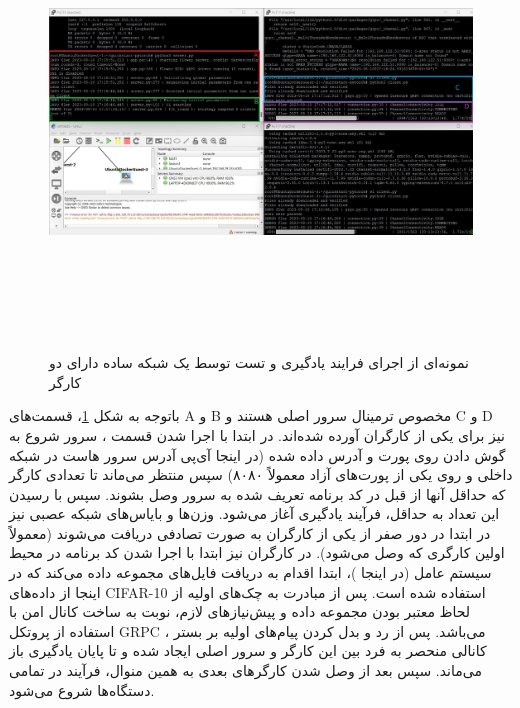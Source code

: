 \begin{figure}[H]
    \centering
   \includegraphics[height=12cm,width=16cm]{./GNS3/running.jpg}
   \caption{ نمونه‌ای از اجرای فرایند یادگیری و تست توسط یک شبکه ساده دارای دو کارگر}
   \label{running}
   \centering
\end{figure}


باتوجه به‌ شکل \ref{running}، قسمت‌های A و B مخصوص ترمینال سرور اصلی هستند و C و D نیز برای یکی از کارگران آورده شده‌اند. در ابتدا با اجرا شدن قسمت ، سرور شروع به گوش دادن روی پورت و آدرس داده ‌شده (در اینجا آی‌پی آدرس سرور هاست در شبکه داخلی و روی یکی از پورت‌های آزاد معمولاً ۸۰۸۰) سپس منتظر می‌ماند تا تعدادی کارگر که حداقل آنها از قبل در کد برنامه تعریف شده به سرور وصل بشوند. سپس با رسیدن این تعداد به حداقل، فرآیند یادگیری آغاز می‌شود. وزن‌ها و بایاس‌های شبکه عصبی نیز در ابتدا در دور صفر از یکی از کارگران به صورت تصادفی دریافت می‌شوند (معمولاً اولین کارگری که وصل می‌شود). 
در کارگران نیز ابتدا با اجرا شدن کد برنامه در محیط سیستم عامل (در اینجا )، ابتدا اقدام به دریافت فایل‌های مجموعه داده می‌کند که در اینجا از داده‌های CIFAR-10 استفاده شده است. پس از مبادرت به چک‌های اولیه از لحاظ معتبر بودن مجموعه داده و پیش‌نیاز‌های لازم، نوبت به ساخت کانال امن با استفاده از پروتکل GRPC می‌باشد. پس از رد و بدل کردن پیام‌های اولیه بر بستر ، کانالی منحصر به فرد بین این کارگر و سرور اصلی ایجاد شده و تا پایان یادگیری باز می‌ماند. سپس بعد از وصل شدن کارگرهای بعدی به همین منوال، فرآیند در تمامی دستگا‌ه‌ها شروع می‌شود.

